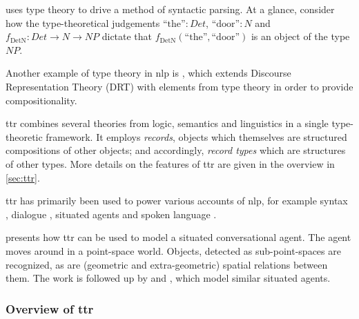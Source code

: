 \cite{RantaTypetheoreticalGrammar1995} uses type theory to drive a method of syntactic parsing.
At a glance, consider how the type-theoretical judgements $\text{``the''} : \mathit{Det}$, $\text{``door''} : \mathit{N}$ and $f_\text{DetN}:\mathit{Det}\rightarrow\mathit{N}\rightarrow\mathit{NP}$ dictate that $f_\text{DetN}(\text{``the''}, \text{``door''})$ is an object of the type $\mathit{NP}$.

Another example of type theory in \gls{nlp} is \cite{KohlhaseTypeTheoreticSemanticslDRT1996}, which extends Discourse Representation Theory (DRT) with elements from type theory in order to provide compositionality.



\Gls{ttr} \citep{CooperRecordsRecordTypes2005} combines several theories from logic, semantics and linguistics in a single type-theoretic framework.
It employs \textit{records}, objects which themselves are structured compositions of other objects;
and accordingly, \textit{record types} which are structures of other types.
More details on the features of \gls{ttr} are given in the overview in \autoref{sec:ttr}.

\gls{ttr} has primarily been used to power various accounts of \gls{nlp}, for example
syntax \citep{CooperAustiniantruthattitudes2005, CooperRecordsRecordTypes2005, CooperTypetheorysemantics2012, CooperTypetheorylanguage2016},
dialogue \citep{Larssonformalviewcorrective2009, LarssonDialoguesHaveContent2011, CooperTypetheorylanguage2016},
situated agents \citep{DobnikModellinglanguageaction2012, ttrspat,lspc} and
spoken language \citep{CooperTypetheorylanguage2016}.


\cite{DobnikModellinglanguageaction2012} presents how \gls{ttr} can be used to model a situated conversational agent.
The agent moves around in a point-space world.
Objects, detected as sub-point-spaces are recognized, as are (geometric and extra-geometric) spatial relations between them.
The work is followed up by \cite{ttrspat} and \cite{lspc}, which model similar situated agents.




\subsubsection{Overview of \gls{ttr}}
\label{sec:ttr}


